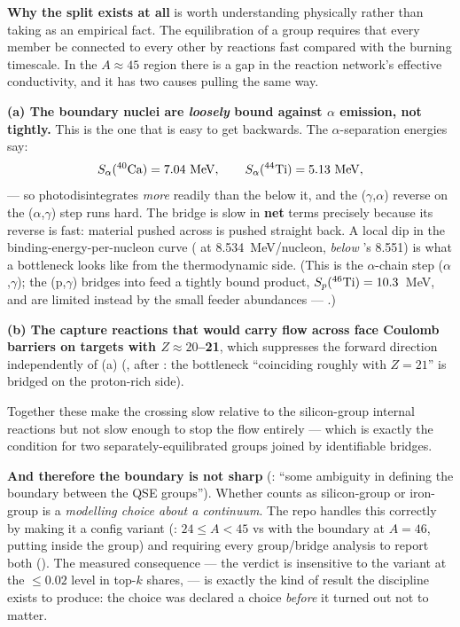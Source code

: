 \textbf{Why the split exists at all} is worth understanding physically rather
than taking as an empirical fact. The equilibration of a group requires that
every member be connected to every other by reactions fast compared with the
burning timescale. In the $A \approx 45$ region there is a gap in the reaction
network's effective conductivity, and it has two causes pulling the same way.

\textbf{(a) The boundary nuclei are \emph{loosely} bound against $\alpha$
emission, not tightly.} This is the one that is easy to get backwards. The
$\alpha$-separation energies say:
%
\begin{equation}
S_\alpha(\nuc{Ca}{40}) = 7.04\ \mathrm{MeV},
\qquad
S_\alpha(\nuc{Ti}{44}) = 5.13\ \mathrm{MeV},
\label{eq:salpha}
\end{equation}
%
 --- so 
photodisintegrates \emph{more} readily than the  below it, and the
($\gamma$,$\alpha$) reverse on the ($\alpha$,$\gamma$)
step runs hard. The bridge is slow in \textbf{net} terms precisely because its
reverse is fast: material pushed across is pushed straight back. A local dip in
the binding-energy-per-nucleon curve ( at 8.534~MeV/nucleon,
\emph{below} 's 8.551) is what a bottleneck looks like from the
thermodynamic side. (This is the $\alpha$-chain step
($\alpha$,$\gamma$); the (p,$\gamma$) bridges into
 feed a tightly bound product, $S_p(\nuc{Ti}{46}) = 10.3$~MeV, and
are limited instead by the small feeder abundances ---
\citealt[\S 6.2]{hix1996}.)

\textbf{(b) The capture reactions that would carry flow across face Coulomb
barriers on targets with $Z \approx 20$--21}, which suppresses the forward
direction independently of (a) (\citealt[\S 1]{hix1996}, after
\citealt{thielemann1985}: the bottleneck ``coinciding roughly with $Z = 21$'' is
bridged on the proton-rich side).

Together these make the crossing slow relative to the silicon-group internal
reactions but not slow enough to stop the flow entirely --- which is exactly the
condition for two separately-equilibrated groups joined by identifiable bridges.

\textbf{And therefore the boundary is not sharp} (\citealt[\S 4]{hix1996}:
``some ambiguity in defining the boundary between the QSE groups''). Whether
 counts as silicon-group or iron-group is a \emph{modelling choice
about a continuum}. The repo handles this correctly by making it a config
variant (:  $24 \le A < 45$ vs
 with the boundary at $A = 46$, putting  inside the
group) and requiring every group/bridge analysis to report both
(). The measured consequence --- the verdict is insensitive to
the variant at the $\le 0.02$ level in top-$k$ shares,
 --- is exactly the kind of result the discipline exists
to produce: the choice was declared a choice \emph{before} it turned out not to
matter.

